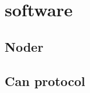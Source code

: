

%
%
%
%
%

%

\part{software}
\chapter{Noder}
    
\chapter{Can protocol}
	

%	

%	


	\label{sidste_side}

